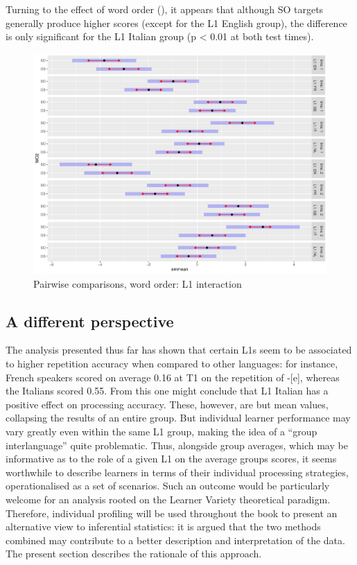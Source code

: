 Turning to the effect of word order (), it appears that although SO targets generally produce higher scores (except for the L1 English group), the difference is only significant for the L1 Italian group (p < 0.01 at both test times).

\begin{figure}
    \includegraphics[width=\textwidth]{figures/04-4.pdf}
    \caption{Pairwise comparisons, word order: L1 interaction}
    \label{fig:04:4}
\end{figure}

\subsection{A different perspective}\label{sec:04:2.4}

The analysis presented thus far has shown that certain L1s seem to be associated to higher repetition accuracy when compared to other languages: for instance, French speakers scored on average 0.16 at T1 on the repetition of -[e], whereas the Italians scored 0.55. From this one might conclude that L1 Italian has a positive effect on processing accuracy. These, however, are but mean values, collapsing the results of an entire group. But individual learner performance may vary greatly even within the same L1 group, making the idea of a ``group interlanguage'' quite problematic. Thus, alongside group averages, which may be informative as to the role of a given L1 on the average groups scores, it seems worthwhile to describe learners in terms of their individual processing strategies, operationalised as a set of scenarios. Such an outcome would be particularly welcome for an analysis rooted on the Learner Variety theoretical paradigm. Therefore, individual profiling will be used throughout the book to present an alternative view to inferential statistics: it is argued that  the two methods combined may contribute to a better description and interpretation of the data. The present section describes the rationale of this approach.

